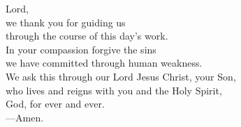 \prayer


\begin{prayerverse}
Lord,\\
we thank you for guiding us\\
through the course of this day’s work.\\
In your compassion forgive the sins\\
we have committed through human weakness.\\
We ask this through our Lord Jesus Christ, your Son,\\
who lives and reigns with you and the Holy Spirit,\\
God, for ever and ever.\\
{\color{red}---\thinspace}Amen.
\end{prayerverse}

